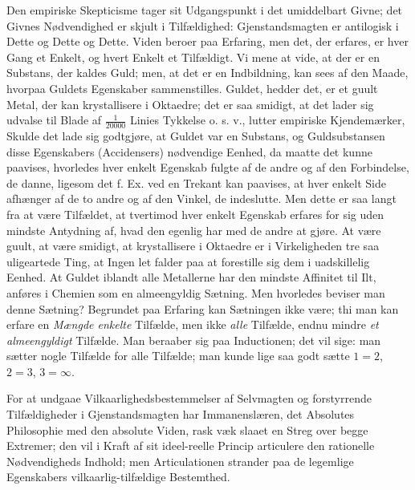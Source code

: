 \documentclass[12pt,a4paper]{book}
\begin{document}
Den empiriske Skepticisme tager sit Udgangspunkt i det umiddelbart
Givne; det Givnes Nødvendighed er skjult i Tilfældighed:
Gjenstandsmagten er antilogisk i Dette og Dette og Dette. Viden beroer
paa Erfaring, men det, der erfares, er hver Gang et Enkelt, og hvert
Enkelt et Tilfældigt. Vi mene at vide, at der er en Substans, der
kaldes Guld; men, at det er en Indbildning, kan sees af den Maade,
hvorpaa Guldets Egenskaber sammenstilles. Guldet, hedder det, er et
guult Metal, der kan krystallisere i Oktaedre; det er saa smidigt, at
det lader sig udvalse til Blade af $\frac{1}{20000}$ Linies Tykkelse
o. s. v., lutter empiriske Kjendemærker,
Skulde det lade sig godtgjøre, at Guldet var en Substans, og
Guldsubstansen disse Egenskabers (Accidensers) nødvendige Eenhed, da
maatte det kunne paavises, hvorledes hver enkelt Egenskab fulgte af de
andre og af den Forbindelse, de danne, ligesom det f. Ex. ved en
Trekant kan paavises, at hver enkelt Side afhænger af de to andre og
af den Vinkel, de indeslutte. Men dette er saa langt fra at være
Tilfældet, at tvertimod hver enkelt Egenskab erfares for sig uden
mindste Antydning af, hvad den egenlig har med de andre at gjøre. At
være guult, at være smidigt, at krystallisere i Oktaedre er i
Virkeligheden tre saa uligeartede Ting, at Ingen let falder paa at
forestille sig dem i uadskillelig Eenhed. At Guldet iblandt alle
Metallerne har den mindste Affinitet til Ilt, anføres i Chemien som en
almeengyldig Sætning. Men hvorledes beviser man denne Sætning?
Begrundet paa Erfaring kan Sætningen ikke være; thi man
kan erfare en \emph{Mængde enkelte} Tilfælde, men ikke \emph{alle}
Tilfælde, endnu mindre \emph{et almeengyldigt} Tilfælde. Man beraaber
sig paa Inductionen; det vil sige: man sætter nogle Tilfælde for alle
Tilfælde; man kunde lige saa godt sætte $1 = 2$, $2 = 3$,
$3 = \infty$.

For at undgaae Vilkaarlighedsbestemmelser af Selvmagten og
forstyrrende Tilfældigheder i Gjenstandsmagten har Immanenslæren, det
Absolutes Philosophie med den absolute Viden, rask væk slaaet en Streg
over begge Extremer; den vil i Kraft af sit ideel-reelle Princip
articulere den rationelle Nødvendigheds Indhold; men Articulationen
strander paa de legemlige Egenskabers vilkaarlig-tilfældige
Bestemthed.
\end{document}
